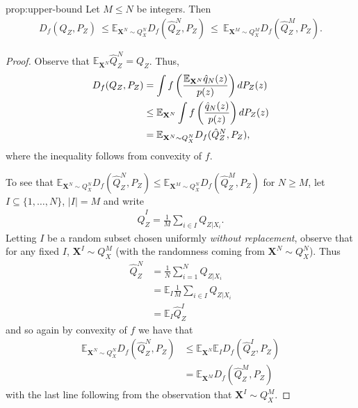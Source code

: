 \begin{repproposition}{prop:upper-bound}
Let $M \leq N$ be integers. Then
\begin{align*}
    D_f(Q_Z , P_Z) \ \leq 
    \mathbb{E}_{\mathbf{X}^N \sim Q_{X}^N} D_f( \hat{Q}_Z^N , P_Z) \  \leq \ \mathbb{E}_{\mathbf{X}^M \sim Q_{X}^M} D_f( \hat{Q}_Z^M , P_Z).
\end{align*}
\end{repproposition}
\begin{proof}
Observe that $\mathbb{E}_{\mathbf{X}^N} \hat{Q}_Z^N = Q_Z$. Thus,
\begin{align*}
    D_f(Q_Z , P_Z) &= \int f\left(\frac{\mathbb{E}_{\mathbf{X}^N}\hat{q}_N(z)}{p(z)}\right) dP_Z(z) \\
    &\leq \mathbb{E}_{\mathbf{X}^N} \int f\left(\frac{\hat{q}_N(z)}{p(z)}\right) dP_Z(z)\\
    &=\mathbb{E}_{\mathbf{X}^N \sim Q_{X}^N} D_f( \hat{Q}_Z^N , P_Z),
\end{align*}
where the inequality follows from convexity of $f$.

To see that $\mathbb{E}_{\mathbf{X}^N \sim Q_{X}^N} D_f( \hat{Q}_Z^N , P_Z) \leq \mathbb{E}_{\mathbf{X}^M \sim Q_{X}^N} D_f( \hat{Q}_Z^M , P_Z)$ for $N \geq M$,
let $I \subseteq \{1, \ldots, N\}$, $|I| = M$ and write
\begin{align*}
    \hat{Q}_Z^I = \frac{1}{M} \sum_{i \in I} Q_{Z | X_i}.
\end{align*}
%
Letting $I$ be a random subset chosen uniformly \emph{without replacement},
observe that for any fixed $I$, $\mathbf{X}^I \sim Q_X^M$ (with the randomness coming from $\mathbf{X}^N \sim Q_X^N$). Thus
%
\begin{align*}
    \hat{Q}_Z^N &= \frac{1}{N} \sum_{i=1}^N Q_{Z|X_i} \\
    &= \mathbb{E}_I \frac{1}{M} \sum_{i \in I} Q_{Z|X_i} \\
    &= \mathbb{E}_I \hat{Q}_Z^I
\end{align*}
%
and so again by convexity of $f$ we have that
%
\begin{align*}
    \mathbb{E}_{\mathbf{X}^N \sim Q_{X}^N} D_f( \hat{Q}_Z^N , P_Z) &\leq  \mathbb{E}_{\mathbf{X}^N} \mathbb{E}_I D_f( \hat{Q}_Z^I , P_Z) \\
    &= \mathbb{E}_{\mathbf{X}^M} D_f(\hat{Q}_Z^M , P_Z)
\end{align*}
with the last line following from the observation that $\mathbf{X}^I \sim Q_X^M$.
\end{proof}



